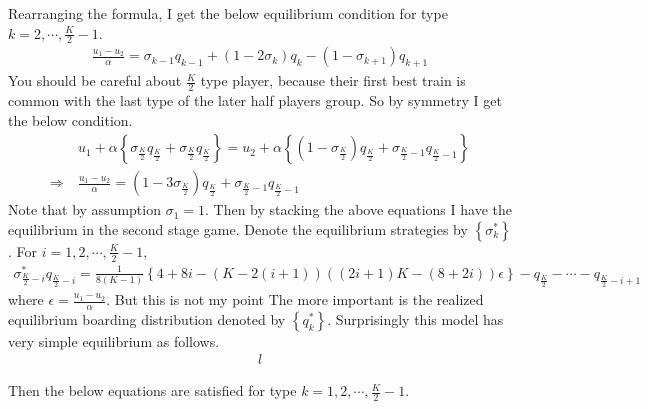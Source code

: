 \documentclass{article}
\begin{document}
Rearranging the formula, I get the below equilibrium condition for type $k = 2, \cdots, \frac{K}{2} -1$.
\begin{align*}
	\frac{u_1 - u_2}{\alpha} = \sigma_{k-1} q_{k-1} + (1 - 2 \sigma_{k}) q_k - (1-\sigma_{k+1}) q_{k + 1}
\end{align*}
You should be careful about $\frac{K}{2}$ type player, because their first best train is common with the last type of the later half players group. So by symmetry I get the below condition.
\begin{align*}
	&u_1 + \alpha \left\{ \sigma_{\frac{K}{2}} q_{\frac{K}{2}} + \sigma_{\frac{K}{2}} q_{\frac{K}{2}} \right\} = u_2 + \alpha \left\{ (1-\sigma_{\frac{K}{2}}) q_{\frac{K}{2}} + \sigma_{\frac{K}{2}-1} q_{\frac{K}{2}-1} \right\}\\[8pt]
	\Rightarrow\ &\frac{u_1 -u_2}{\alpha} = (1 - 3 \sigma_{\frac{K}{2}}) q_{\frac{K}{2}} +  \sigma_{\frac{K}{2}-1} q_{\frac{K}{2}-1}
\end{align*}
Note that by assumption $\sigma_1 = 1$. Then by stacking the above equations I have the equilibrium in the second stage game. Denote the equilibrium strategies by $\left\{ \sigma_k^{*} \right\}$. For $i = 1, 2, \cdots, \frac{K}{2} -1$,
\begin{align*}
	\sigma_{\frac{K}{2} -i}^{*} q_{\frac{K}{2} -i} = \frac{1}{8(K-1)} \left\{ 4 + 8i - (K - 2(i + 1))((2i+1)K - (8+2i))\epsilon \right\} - q_{\frac{K}{2}} - \cdots - q_{\frac{K}{2} - i + 1}
\end{align*}
where $\epsilon = \frac{u_1 - u_2}{\alpha}$. But this is not my point The more important is the realized equilibrium boarding distribution denoted by $\left\{ q_k^{*} \right\}$. Surprisingly this model has very simple equilibrium as follows.
\begin{align*}
	l
\end{align*}

Then the below equations are satisfied for type $k = 1, 2, \cdots, \frac{K}{2} -1$.
\end{document}
